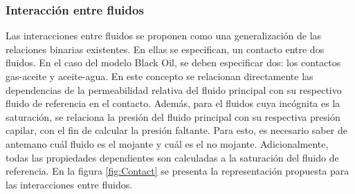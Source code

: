 \subsubsection{Interacción entre fluidos}\label{sec:PS_Interphase}
%

Las interacciones entre fluidos se proponen como una generalización de las relaciones binarias existentes. En ellas se especifican, un contacto entre dos fluidos. En el caso del modelo Black Oil, se deben especificar dos: los contactos gas-aceite y aceite-agua. En este concepto se relacionan directamente las dependencias de la permeabilidad relativa del fluido principal con su respectivo fluido de referencia en el contacto. Además, para el fluidos cuya incógnita es la saturación, se relaciona la presión del fluido principal con su respectiva presión capilar, con el fin de calcular la presión faltante. Para esto, es necesario saber de antemano cuál fluido es el mojante y cuál es el no mojante. Adicionalmente, todas las propiedades dependientes son calculadas a la saturación del fluido de referencia. En la figura \ref{fig:Contact} se presenta la representación propuesta para las interacciones entre fluidos.


